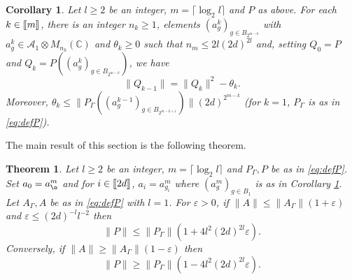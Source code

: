 \documentclass[11pt]{article}
\newtheorem{theorem}[lemma]{Theorem}
\newtheorem{corollary}[lemma]{Corollary}
\newcommand{\cA}{\mathcal{A}}
\newcommand{\dC}{\mathbb {C}}
\newcommand{\1}{1\!\!{\sf I}}
\newcommand{\veps}{\varepsilon}
\newcommand{\INT}[1]{{{\left[\hspace{-1.4pt}\left[#1\right]\hspace{-1.4pt}\right]}}}
\begin{document}
\begin{corollary}\label{cor:linea}
Let $l \geq 2$ be an integer, $m = \lceil \log_2 l \rceil $ and $P$ as above. For each $k \in \INT{m}$, there  is an integer $n_k \geq 1$, elements $(a^k_g)_{g \in B_{2^{m-k}}}$ with $a^k_g \in \cA_1 \otimes M_{n_k}(\dC)$ and $\theta_k \geq  0$ such that $n_m \leq 2l(2d)^{2l}$ and, setting $Q_0 = P$ and $Q_k = P ( (a^k_g)_{g \in B_{2^{m-k}}})$, we have
$$
 \| Q_{k-1} \| = \| Q_k \|^2 - \theta_k.
$$
Moreover, $\theta_k \leq \| P_\Gamma ((a^{k-1}_g)_{g \in B_{2^{m-k+1}}}) \| (2d)^{2^{m-k}}$ (for $k=1$, $P_\Gamma$ is as in \eqref{eq:defP}).
\end{corollary}



The main result of this section is the following theorem. 

\begin{theorem}\label{le:P2A}
Let $l \geq 2$ be an integer, $m = \lceil \log_2 l \rceil $  and $P_\Gamma, P$ be as in \eqref{eq:defP}. Set $a_0 = a^m_{\o}$ and for $i \in \INT{2d}$, $a_i = a^m_{g_i}$ where $(a^m_g)_{g \in B_1}$ is as in Corollary \ref{cor:linea}. Let $A_\Gamma , A $ be as in \eqref{eq:defP} with $l=1$. For $\veps >0$, if $\| A \| \leq \| A_\Gamma \| ( 1+ \veps)$ and $\veps \leq (2d)^{-l} l ^{-2}$ then 
$$
\| P \| \leq \| P_\Gamma \| ( 1 + 4 l^2 (2d)^{2l} \veps ).
$$ 
Conversely, if $\| A\| \geq \| A_\Gamma \| ( 1- \veps)$ then 
$$
\| P \| \geq \| P_\Gamma \| ( 1 - 4 l^2 (2d)^{2l} \veps ).
$$ 
\end{theorem}
\end{document}
